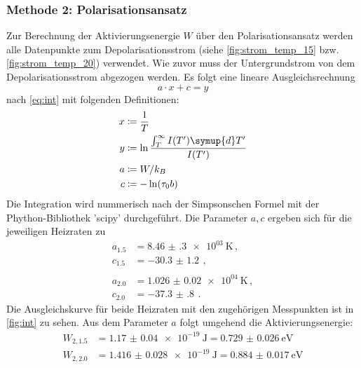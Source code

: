 \subsubsection{Methode 2: Polarisationsansatz}
Zur Berechnung der Aktivierungsenergie $W$ über den Polarisationsansatz werden alle Datenpunkte zum Depolarisationsstrom (siehe \autoref{fig:strom_temp_15} bzw. \autoref{fig:strom_temp_20}) verwendet.
Wie zuvor muss der Untergrundstrom von dem Depolarisationsstrom abgezogen werden.
Es folgt eine lineare Ausgleichsrechnung
\begin{equation*}
    a \cdot x + c = y
\end{equation*}
nach \autoref{eq:int} mit folgenden Definitionen:
\begin{align*}
    x &\coloneqq \frac{1}{T} \\
    y &\coloneqq \ln \frac{ \int_{T}^{\infty} I(T')\symup{d}T'}{I(T')} \\
    a &\coloneqq W/k_B \\
    c &\coloneqq -\ln (\tau_0 b)
\end{align*}
Die Integration wird nummerisch nach der Simpsonschen Formel mit der Phython-Bibliothek 'scipy'\cite{scipy} durchgeführt.
Die Parameter $a, c$ ergeben sich für die jeweiligen Heizraten zu
\begin{align*}
    a_{1.5} &= \SI{8.46(30)e+03}{\kelvin} \, ,\\
    c_{1.5} &= \SI{-30.3(12)}{} \, , \\
    \\
    a_{2.0} &= \SI{1.026(20)e+04}{\kelvin} \, , \\
    c_{2.0} &= \SI{-37.3(8)}{} \, .
\end{align*}
Die Ausgleichskurve für beide Heizraten mit den zugehörigen Messpunkten ist in \autoref{fig:int} zu sehen.
Aus dem Parameter $a$ folgt umgehend die Aktivierungsenergie:
\begin{align*}
    W_{2, 1.5} &= \SI{1.17(4)e-19}{\joule} = \SI{0.729(26)}{\electronvolt} \\
    W_{2, 2.0} &= \SI{1.416(28)e-19}{\joule} = \SI{0.884(17)}{\electronvolt} \\
\end{align*}

